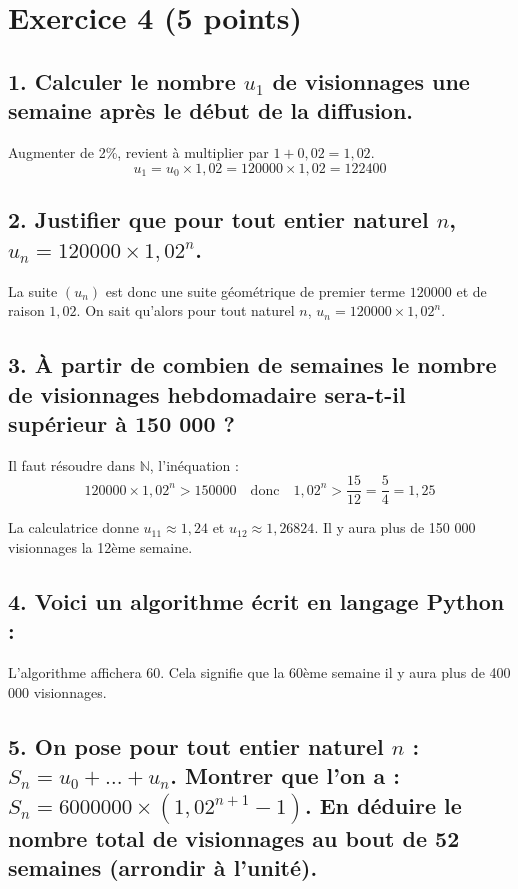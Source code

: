 \section*{Exercice 4 (5 points)}
	
\subsection*{1. Calculer le nombre $u_1$ de visionnages une semaine après le début de la diffusion.}
	
Augmenter de 2\%, revient à multiplier par $1 + 0,02 = 1,02$.
	\[
	u_1 = u_0 \times 1,02 = 120000 \times 1,02 = 122400
	\]
	
	\subsection*{2. Justifier que pour tout entier naturel $n$, $u_n = 120000 \times 1,02^n$.}
	
La suite $(u_n)$ est donc une suite géométrique de premier terme $120 000$ et de raison $1,02$. On sait qu’alors pour tout naturel $n$, $u_n = 120000 \times 1,02^n$.
	
	\subsection*{3. À partir de combien de semaines le nombre de visionnages hebdomadaire sera-t-il supérieur à 150 000 ?}
	
	Il faut résoudre dans $\mathbb{N}$, l’inéquation :
	\[
	120000 \times 1,02^n > 150000 \quad \text{donc} \quad 1,02^n > \dfrac{15}{12} = \dfrac{5}{4} = 1,25
	\]
	
	La calculatrice donne $u_{11} \approx 1,24$ et $u_{12} \approx 1,26824$. Il y aura plus de 150 000 visionnages la 12ème semaine.
	
\subsection*{4. Voici un algorithme écrit en langage Python :}
L’algorithme affichera 60. Cela signifie que la 60ème semaine il y aura plus de 400 000 visionnages.
	
	\subsection*{5. On pose pour tout entier naturel $n$ : $S_n = u_0 + \ldots + u_n$. Montrer que l’on a : $S_n = 6000000 \times (1,02^{n+1} - 1)$. En déduire le nombre total de visionnages au bout de 52 semaines (arrondir à l’unité).}
	
